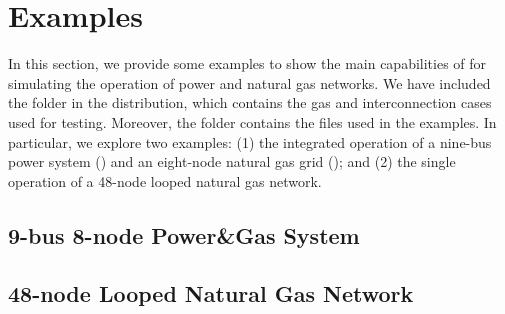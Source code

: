 \chapter{Examples}
\label{chap:examples}

In this section, we provide some examples to show the main capabilities of \mpng{} for simulating the operation of power and natural gas networks. We have included the folder \mpngcasepath{} in the distribution, which contains the gas and interconnection cases used for testing. Moreover, the folder \mpngexamplepath{} contains the files used in the examples. In particular, we explore two examples: (1) the integrated operation of a nine-bus power system () and an eight-node natural gas grid (); and (2) the single operation of a 48-node looped natural gas network.

\section{9-bus 8-node Power\&Gas System}
\label{sec:8-9_gas_power}



\section{48-node Looped Natural Gas Network}
\label{sec:48_gas}
